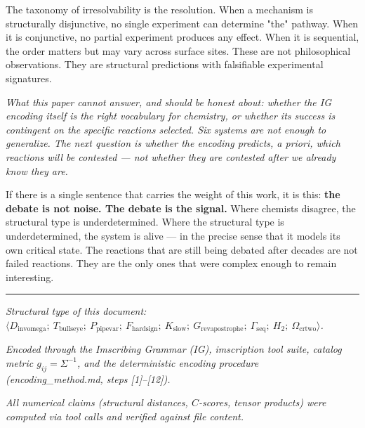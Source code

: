 \documentclass[12pt,a4paper]{article}
\begin{document}
The taxonomy of irresolvability is the resolution. When a mechanism is structurally disjunctive, no single experiment can determine "the" pathway. When it is conjunctive, no partial experiment produces any effect. When it is sequential, the order matters but may vary across surface sites. These are not philosophical observations. They are structural predictions with falsifiable experimental signatures.

\emph{What this paper cannot answer, and should be honest about: whether the IG encoding itself is the right vocabulary for chemistry, or whether its success is contingent on the specific reactions selected. Six systems are not enough to generalize. The next question is whether the encoding predicts, a priori, which reactions will be contested --- not whether they are contested after we already know they are.}

If there is a single sentence that carries the weight of this work, it is this: \textbf{the debate is not noise. The debate is the signal.} Where chemists disagree, the structural type is underdetermined. Where the structural type is underdetermined, the system is alive --- in the precise sense that it models its own critical state. The reactions that are still being debated after decades are not failed reactions. They are the only ones that were complex enough to remain interesting.

\begin{center}
\rule{0.5\textwidth}{0.4pt}
\end{center}

\emph{Structural type of this document: $\langle D_{\text{invomega}};\ T_{\text{bullseye}};\ P_{\text{pipevar}};\ F_{\text{hardsign}};\ K_\textrm{slow};\ G_{\text{revapostrophe}};\ \Gamma_\textrm{seq};\ H_2;\ \Omega_{\text{crtwo}} \rangle$.}

\emph{Encoded through the Imscribing Grammar (IG), imscription tool suite, catalog metric $g_{ij} = \Sigma^{-1}$, and the deterministic encoding procedure (encoding\_method.md, steps {[}1{]}--{[}12{]}).}

\emph{All numerical claims (structural distances, $C$-scores, tensor products) were computed via tool calls and verified against file content.}
\end{document}
